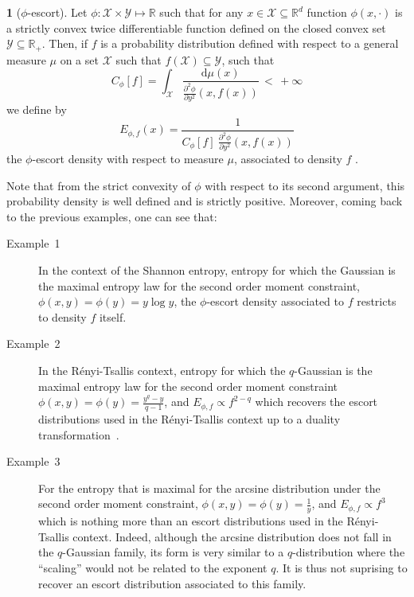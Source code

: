 \documentclass[english,sort&compress]{elsarticle}
\theoremstyle{definition}
\newtheorem{defn}{\protect\definitionname}
\theoremstyle{plain}
\theoremstyle{plain}
\providecommand{\definitionname}{Definition}
\def\dmu{\mathrm{d}\mu}
\def\Rset{\mathbb{R}}
\def\X{\mathcal{X}}
\def\Y{\mathcal{Y}}
\begin{document}
\begin{defn}[$\phi$-escort]\label{def:phi-escort}
  Let $\phi: \X \times  \Y \mapsto \Rset$ such that for any  $x \in \X \subseteq
  \Rset^d$ function  $\phi(x,\cdot)$ is  a strictly convex  twice differentiable
  function defined  on the closed convex  set $\Y \subseteq \Rset_+$.   Then, if
  $f$ is  a probability distribution defined  with respect to a  general measure
  $\mu$ on a set $\X$ such that $f(\X) \subseteq \Y$, such that
  \begin{equation}
\label{eq:Cphi}
  C_\phi[f]    =     \int_\X    \frac{\dmu(x)}{\frac{\partial^2    \phi}{\partial
      y^2}(x,f(x))} \, < \, + \infty
  \end{equation}
  we define by
  \begin{equation}\label{eq:phi-escort}
    E_{\phi,f}(x) = \frac{1}{\displaystyle C_\phi[f] \: \frac{\partial^2
    \phi}{\partial y^2}(x,f(x))}
  \end{equation}
  the $\phi$-escort density with respect to measure $\mu$, associated to density
  $f$ .
\end{defn}
%
Note  that from  the  strict convexity  of  $\phi$ with  respect  to its  second
argument,   this  probability   density  is   well  defined   and   is  strictly
positive. Moreover, coming back to the previous examples, one can see that:
%
\begin{description}%
\item[Example~1] In  the context of the  Shannon entropy, entropy  for which the
  Gaussian is  the maximal entropy law  for the second  order moment constraint,
  $\phi(x,y) = \phi(y) = y \log  y$, the $\phi$-escort density associated to $f$
  restricts to density $f$ itself.
%
\item[Example~2]  In   the  R\'enyi-Tsallis  context,  entropy   for  which  the
  $q$-Gaussian is the maximal entropy law for the second order moment constraint
  $\phi(x,y) =  \phi(y) =  \frac{y^q-y}{q-1}$, and $E_{\phi,f}  \propto f^{2-q}$
  which recovers the escort distributions  used in the R\'enyi-Tsallis context up
  to a duality transformation~\cite{Nau11}.
\item[Example~3] For  the entropy that  is maximal for the  arcsine distribution
  under the second order moment constraint, $\phi(x,y) = \phi(y) = \frac{1}{y}$,
  and  $E_{\phi,f}   \propto  f^3$  which   is  nothing  more  than   an  escort
  distributions used in the R\'enyi-Tsallis context. Indeed, although the arcsine
  distribution  does not  fall  in the  $q$-Gaussian  family, its  form is  very
  similar to  a $q$-distribution where the  ``scaling'' would not  be related to
  the exponent $q$.  It is thus not suprising to  recover an escort distribution
  associated to this family.
\end{description}
\end{document}
